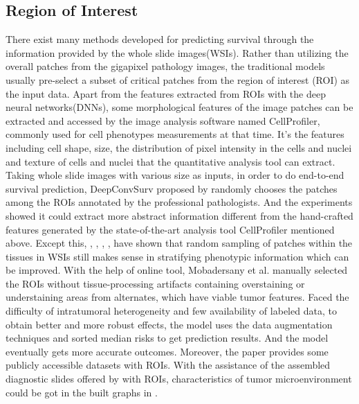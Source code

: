 \documentclass[journal,twoside,web]{ieeecolor}
\begin{document}
\subsection{Region of Interest}
There exist many methods developed for predicting survival through the information provided by the whole slide images(WSIs).
Rather than utilizing the overall patches from the gigapixel pathology images, the traditional models usually pre-select a subset of critical patches from the region of interest (ROI) as the input data.
Apart from the features extracted from ROIs with the deep neural networks(DNNs), some morphological features of the image patches can be extracted and accessed by the image analysis software named CellProfiler\cite{lamprecht2007cellprofiler}, commonly used for cell phenotypes measurements at that time.
It's the features including cell shape, size, the distribution of pixel intensity in the cells and nuclei and texture of cells and nuclei that the quantitative analysis tool can extract.
Taking whole slide images with various size as inputs, in order to do end-to-end survival prediction, DeepConvSurv proposed by \cite{zhu2016deep} randomly chooses the patches among the ROIs annotated by the professional pathologists.
And the experiments showed it could extract more abstract information different from the hand-crafted features generated by the state-of-the-art analysis tool CellProfiler mentioned above.
Except this, \cite{zhu2017wsisa}, \cite{di2020ranking}, \cite{yao2020whole}, \cite{abbet2020divide}, \cite{yao2019deep} have shown that random sampling of patches within the tissues in WSIs still makes sense in stratifying phenotypic information which can be improved.
With the help of online tool, Mobadersany et al.\cite{mobadersany2018predicting} manually selected the ROIs without tissue-processing artifacts containing overstaining or understaining areas from alternates, which have viable tumor features. 
Faced the difficulty of intratumoral heterogeneity and few availability of labeled data, to obtain better and more robust effects, the model uses the data augmentation techniques and sorted median risks to get prediction results.
And the model eventually gets more accurate outcomes. 
Moreover, the paper provides some publicly accessible datasets with ROIs.
With the assistance of the assembled diagnostic slides offered by \cite{mobadersany2018predicting} with ROIs, characteristics of tumor microenvironment could be got in the built graphs in \cite{chen2020pathomic}.
\end{document}
